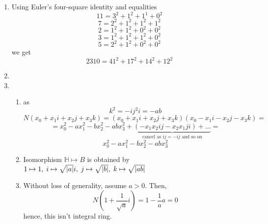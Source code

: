 \documentclass[8pt]{article} %
\title{}
\author{Igor Tereshkov}
\begin{document}
\maketitle
\begin{enumerate}[label=\bfseries Problem \arabic*.]
	\item Using Euler's four-square identity and equalities
		\[11=3^2+1^2+1^1+0^2\]
		\[7=2^2+1^2+1^2+1^2\]
		\[2=1^2+1^2+0^2+0^2\]
		\[3=1^2+1^2+1^2+0^2\]
		\[5=2^2+1^2+0^2+0^2\]
		we get
		\[2310=41^2+17^2+14^2+12^2\]
	\item 
	\item \begin{enumerate}[label=\alph*)]
			\item
				as \[k^2=-ij^2i=-ab\]
				\[N(x_0+x_1i+x_2j+x_3k)=(x_0+x_1i+x_2j+x_3k)(x_0-x_1i-x_2j-x_3k)=\]
				\[=x_0^2-ax_1^2-bx_2^2-abx_3^2+\underbrace{(-x_1x_2ij-x_2x_1ji)+\hdots}_{\mbox{cancel as $ij=-ij$ and so on}}=\]
				\[x_0^2-ax_1^2-bx_2^2-abx_3^2\]
			\item Isomorphism $\mathbb{H}\mapsto B$
				is obtained by $1\mapsto1,\;i\mapsto \sqrt{\left|a\right|}i,\;j\mapsto\sqrt{\left|b\right|},\;k\mapsto\sqrt{\left|ab\right|}$
			\item Without loss of generality, assume $a>0$. Then,
				\[N(1+\frac{1}{\sqrt{a}}i)=1-\frac{1}{a}a=0\]
				hence, this isn't integral ring.
		\end{enumerate}
\end{enumerate}
\end{document}

